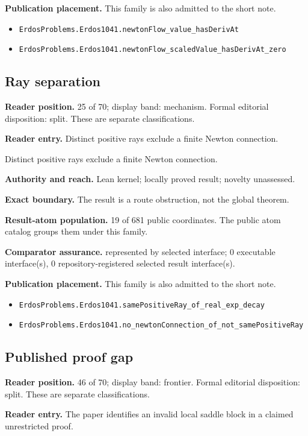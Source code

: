 \documentclass[11pt]{article}
\begin{document}
\textbf{Publication placement.} This family is also admitted to the short note.

\begin{itemize}
  \item \nolinkurl{ErdosProblems.Erdos1041.newtonFlow_value_hasDerivAt}
  \item \nolinkurl{ErdosProblems.Erdos1041.newtonFlow_scaledValue_hasDerivAt_zero}
\end{itemize}

\subsection{Ray separation}
\textbf{Reader position.} 25 of 70; display band: mechanism.  Formal editorial disposition: split.  These are separate classifications.

\textbf{Reader entry.} Distinct positive rays exclude a finite Newton connection.

Distinct positive rays exclude a finite Newton connection.

\textbf{Authority and reach.} Lean kernel; locally proved result; novelty unassessed.

\textbf{Exact boundary.} The result is a route obstruction, not the global theorem.

\textbf{Result-atom population.} 19 of 681 public coordinates. The public atom catalog groups them under this family.

\textbf{Comparator assurance.} represented by selected interface; 0 executable interface(s), 0 repository-registered selected result interface(s).

\textbf{Publication placement.} This family is also admitted to the short note.

\begin{itemize}
  \item \nolinkurl{ErdosProblems.Erdos1041.samePositiveRay_of_real_exp_decay}
  \item \nolinkurl{ErdosProblems.Erdos1041.no_newtonConnection_of_not_samePositiveRay}
\end{itemize}

\subsection{Published proof gap}
\textbf{Reader position.} 46 of 70; display band: frontier.  Formal editorial disposition: split.  These are separate classifications.

\textbf{Reader entry.} The paper identifies an invalid local saddle block in a claimed unrestricted proof.
\end{document}
